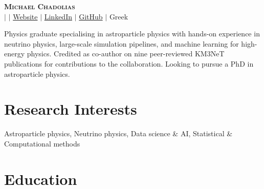 \documentclass[letterpaper,11pt]{article}
\begin{document}

\begin{center}
    \textbf{\Huge \scshape Michael Chadolias} \\ \vspace{3pt}
    \small
    \faMobile \hspace{.5pt} \href{tel:\mobile}{\mobile}
    $|$
    \faAt \hspace{.5pt} \href{mailto:\email}{\email}
    $|$
    \faGlobe \hspace{.5pt} \href{\website}{Website}
    $|$
    \faLinkedinSquare \hspace{.5pt} \href{\linkedin}{LinkedIn}
    $|$
    \faGithub \hspace{.5pt} \href{\gitprofile}{GitHub}
    $|$
    \faMap \hspace{.5pt} Greek
\end{center}

Physics graduate specialising in astroparticle physics with hands-on experience in neutrino physics, large-scale simulation pipelines, and machine learning for high-energy physics. Credited as co-author on nine peer-reviewed KM3NeT publications for contributions to the collaboration. Looking to pursue a PhD in astroparticle physics.
\vspace{1.5pt}


\section{Research Interests}
  \vspace{2pt}
  \resumeSubHeadingListStart
    \small{\item{
        {Astroparticle physics, Neutrino physics, Data science \& AI, Statistical \& Computational methods} 
    }}
  \resumeSubHeadingListEnd

\section{Education}
  \vspace{3pt}
  \resumeSubHeadingListStart
    
\end{document}
